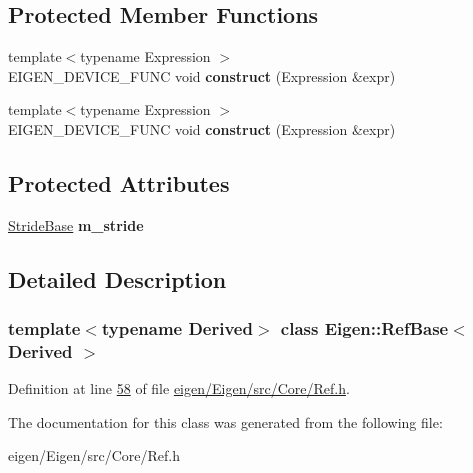 \subsection*{Protected Member Functions}
\begin{DoxyCompactItemize}
\item 
\mbox{\label{class_eigen_1_1_ref_base_aa099f09a8242561fe6d34b55b74e5dcc}} 
{\footnotesize template$<$typename Expression $>$ }\\E\+I\+G\+E\+N\+\_\+\+D\+E\+V\+I\+C\+E\+\_\+\+F\+U\+NC void {\bfseries construct} (Expression \&expr)
\item 
\mbox{\label{class_eigen_1_1_ref_base_aa099f09a8242561fe6d34b55b74e5dcc}} 
{\footnotesize template$<$typename Expression $>$ }\\E\+I\+G\+E\+N\+\_\+\+D\+E\+V\+I\+C\+E\+\_\+\+F\+U\+NC void {\bfseries construct} (Expression \&expr)
\end{DoxyCompactItemize}
\subsection*{Protected Attributes}
\begin{DoxyCompactItemize}
\item 
\mbox{\label{class_eigen_1_1_ref_base_ae640dbacf501f1dc2ba9f5ba3c9f2598}} 
\hyperlink{group___core___module}{Stride\+Base} {\bfseries m\+\_\+stride}
\end{DoxyCompactItemize}


\subsection{Detailed Description}
\subsubsection*{template$<$typename Derived$>$\newline
class Eigen\+::\+Ref\+Base$<$ Derived $>$}



Definition at line \hyperlink{eigen_2_eigen_2src_2_core_2_ref_8h_source_l00058}{58} of file \hyperlink{eigen_2_eigen_2src_2_core_2_ref_8h_source}{eigen/\+Eigen/src/\+Core/\+Ref.\+h}.



The documentation for this class was generated from the following file\+:\begin{DoxyCompactItemize}
\item 
eigen/\+Eigen/src/\+Core/\+Ref.\+h\end{DoxyCompactItemize}
